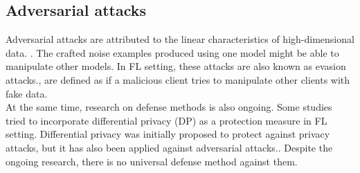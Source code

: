 


 \subsection{ Adversarial attacks }
Adversarial attacks are attributed to the linear characteristics of high-dimensional data. \cite{goodfellow2014explaining}. The crafted noise examples produced using one model might be able to manipulate other models. In FL setting, these attacks are also known as evasion attacks.\cite{biggio2013evasion,costa2021covert,ayub2020model,bouacida2021vulnerabilities}, are defined as if a malicious client tries to manipulate other clients with fake data.\\
At the same time, research on defense methods is also ongoing. Some studies tried to incorporate differential privacy (DP) as a protection measure in FL setting. Differential privacy was initially proposed to protect against privacy attacks, but it has also been applied against adversarial attacks.\cite{bouacida2021vulnerabilities,asgari2018vulnerability,wu2020evaluation}. Despite the ongoing research, there is no universal defense method against them.

